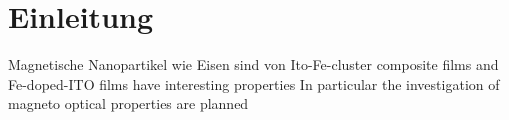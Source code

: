 \chapter{Einleitung}
Magnetische Nanopartikel wie Eisen sind von
Ito-Fe-cluster composite films and Fe-doped-ITO films have interesting properties \cite{Peng.2005, Ohno.2007, Shen.2015}
In particular the investigation of magneto optical properties are planned 

